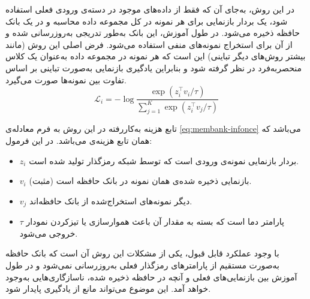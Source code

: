 در این روش، به‌جای آن که فقط از داده‌های موجود در دسته‌ی ورودی فعلی استفاده شود، یک بردار بازنمایی برای هر نمونه در کل مجموعه داده محاسبه و در یک بانک حافظه ذخیره می‌شود. در طول آموزش، این بانک به‌طور تدریجی به‌روزرسانی شده و از آن برای استخراج نمونه‌های منفی استفاده می‌شود. فرض اصلی این روش (مانند بیشتر روش‌های دیگر تباینی) این است که هر نمونه در مجموعه داده به‌عنوان یک کلاس منحصربه‌فرد در نظر گرفته شود و بنابراین یادگیری بازنمایی به‌صورت تباینی بر اساس تفاوت بین نمونه‌ها صورت می‌گیرد.
\begin{equation}
\label{eq:membank-infonce}
\mathcal{L}_i = -\log \frac{\exp(z_i^\top v_i / \tau)}{\sum_{j=1}^{K} \exp(z_i^\top v_j / \tau)}
\end{equation}

تابع هزینه به‌کاررفته در این روش به فرم معادله‌ی \ref{eq:membank-infonce}
می‌باشد که همان تابع هزینه‌ی 
می‌باشد. در این فرمول:
\begin{itemize}
    \item $z_i$ بردار بازنمایی نمونه‌ی ورودی است که توسط شبکه رمزگذار تولید شده است.
    \item $v_i$ بازنمایی ذخیره شده‌ی همان نمونه در بانک حافظه است (مثبت).
    \item $v_j$ دیگر نمونه‌های استخراج‌شده از بانک حافظه‌اند.
    \item $\tau$ پارامتر دما است که بسته به مقدار آن باعث هموارسازی یا تیزکردن نمودار خروجی می‌شود.
\end{itemize}
با وجود عملکرد قابل قبول، یکی از مشکلات این روش آن است که بانک حافظه به‌صورت مستقیم از پارامترهای رمزگذار فعلی به‌روزرسانی نمی‌شود و در طول آموزش بین بازنمایی‌های فعلی و آنچه در حافظه ذخیره شده، ناسازگاری‌هایی به‌وجود خواهد آمد. این موضوع می‌تواند مانع از یادگیری پایدار شود.

